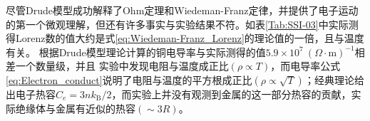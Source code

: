 
尽管Drude模型成功解释了Ohm定理和Wiedeman-Franz定律，并提供了电子运动的第一个微观理解，但还有许多事实与实验结果不符。如表\ref{Tab:SSI-03}中实际测得Lorenz数的值大约是式\eqref{eq:Wiedeman-Franz_Lorenz}的理论值的一倍，且与温度有关。%
根据Drude模型理论计算的铜电导率与实际测得的值$5.9\times10^7~(\Omega\cdot\mathrm{m})^{-1}$相差一个数量级，并且
实验中发现电阻与温度成正比$(\rho\propto T)$，而电导率公式\eqref{eq:Electron_conduct}说明了电阻与温度的平方根成正比$(\rho\propto\sqrt{T})$；经典理论给出电子热容$C_e=3nk_{\mathrm{B}}/2$，而实验上并没有观测到金属的这一部分热容的贡献，实际绝缘体与金属有近似的热容$(\sim3R)$。
